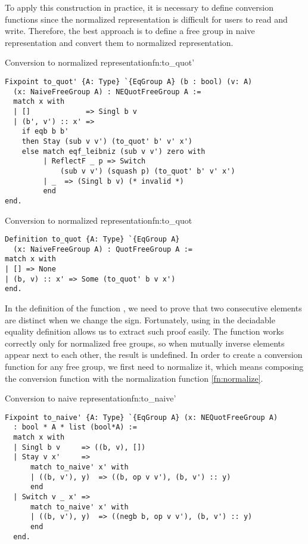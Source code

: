 To apply this construction in practice, it is necessary to define conversion functions since the normalized representation is difficult for users to read and write. Therefore, the best approach is to define a free group in naive representation and convert them to normalized representation.
\begin{func}{Conversion to normalized representation}{fn:to_quot'}
\begin{verbatim}
Fixpoint to_quot' {A: Type} `{EqGroup A} (b : bool) (v: A) 
  (x: NaiveFreeGroup A) : NEQuotFreeGroup A :=
  match x with 
  | []             => Singl b v
  | (b', v') :: x' => 
    if eqb b b' 
    then Stay (sub v v') (to_quot' b' v' x')
    else match eqf_leibniz (sub v v') zero with
         | ReflectF _ p => Switch 
             (sub v v') (squash p) (to_quot' b' v' x')
         | _  => (Singl b v) (* invalid *)
         end
end.
\end{verbatim}
\end{func}
\begin{func}{Conversion to normalized representation}{fn:to_quot}
\begin{verbatim}
Definition to_quot {A: Type} `{EqGroup A} 
  (x: NaiveFreeGroup A) : QuotFreeGroup A :=
match x with
| [] => None
| (b, v) :: x' => Some (to_quot' b v x')
end.
\end{verbatim}
\end{func}
In the definition of the function , we need to prove that two consecutive elements are distinct when we change the sign. Fortunately, using  in the deciadable equality definition allows us to extract such proof easily. The  function works correctly only for normalized free groups, so when mutually inverse elements appear next to each other, the result is undefined. In order to create a conversion function for any free group, we first need to normalize it, which means composing the conversion function with the normalization function \ref{fn:normalize}.
\begin{func}{Conversion to naive representation}{fn:to_naive'}
\begin{verbatim}
Fixpoint to_naive' {A: Type} `{EqGroup A} (x: NEQuotFreeGroup A) 
  : bool * A * list (bool*A) :=
  match x with 
  | Singl b v     => ((b, v), [])
  | Stay v x'     => 
      match to_naive' x' with
      | ((b, v'), y)  => ((b, op v v'), (b, v') :: y)
      end
  | Switch v _ x' => 
      match to_naive' x' with
      | ((b, v'), y)  => ((negb b, op v v'), (b, v') :: y)
      end
  end.
\end{verbatim}
\end{func}
